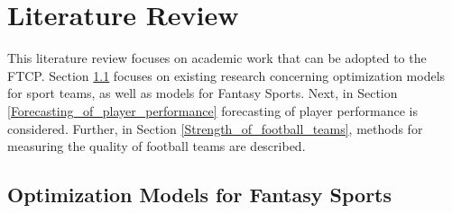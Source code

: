 
\chapter{Literature Review}
This literature review focuses on academic work that can be adopted to the FTCP. Section \ref{Opt_Models_for_Fantasy_Sports} focuses on existing research concerning optimization models for sport teams, as well as models for Fantasy Sports. Next, in Section \ref{Forecasting_of_player_performance} forecasting of player performance is considered. Further, in Section \ref{Strength_of_football_teams}, methods for measuring the quality of football teams are described.




\section{Optimization Models for Fantasy Sports} \label{Opt_Models_for_Fantasy_Sports}

\begin{comment}


- skrive generelt om hvordan optimering er i fantasy verdenen. Er det noe som er mye brukt, hvilke type fantasy er det mye brukt? har det vært en stor suksess? 

\end{comment}

